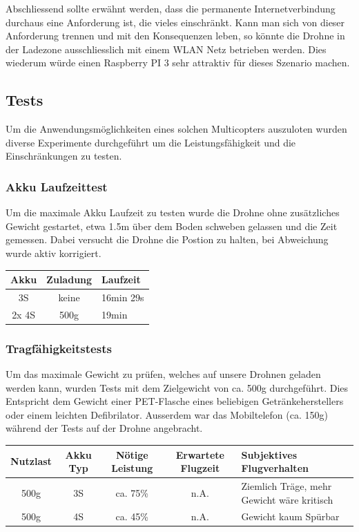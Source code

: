 Abschliessend sollte erwähnt werden, dass die permanente Internetverbindung durchaus eine Anforderung ist, die vieles einschränkt. Kann man sich von dieser Anforderung trennen und mit den Konsequenzen leben, so könnte die Drohne in der Ladezone ausschliesslich mit einem WLAN Netz betrieben werden. Dies wiederum würde einen Raspberry PI 3 sehr attraktiv für dieses Szenario machen.
 
\subsection{Tests}
Um die Anwendungsmöglichkeiten eines solchen Multicopters auszuloten wurden diverse Experimente durchgeführt um die Leistungsfähigkeit und die Einschränkungen zu testen. 

\subsubsection{Akku Laufzeittest}
Um die maximale Akku Laufzeit zu testen wurde die Drohne ohne zusätzliches Gewicht gestartet, etwa 1.5m über dem Boden schweben gelassen und die Zeit gemessen. Dabei versucht die Drohne die Postion zu halten, bei Abweichung wurde aktiv korrigiert. \\

\begin{tabularx}{\textwidth}{|c|c|X|}
\hline
\textbf{Akku} & \textbf{Zuladung} & \textbf{Laufzeit} \\ \hline \hline 
3S & keine & 16min 29s\\ \hline 
2x 4S & 500g & 19min\\ \hline 
\end{tabularx}
\newpage
\subsubsection{Tragfähigkeitstests}
Um das maximale Gewicht zu prüfen, welches auf unsere Drohnen geladen werden kann, wurden Tests mit dem Zielgewicht von ca. 500g durchgeführt. Dies Entspricht dem Gewicht einer PET-Flasche eines beliebigen Getränkeherstellers oder einem leichten Defibrilator. Ausserdem war das Mobiltelefon (ca. 150g) während der Tests auf der Drohne angebracht.  \\

\begin{tabularx}{\textwidth}{|c|c|c|c|X|}
\hline
\textbf{Nutzlast} & \textbf{Akku Typ} & \textbf{Nötige Leistung }& \textbf{Erwartete Flugzeit } & \textbf{Subjektives Flugverhalten }\\
\hline \hline
500g & 3S & ca. 75\%  & n.A. & Ziemlich Träge, mehr Gewicht wäre kritisch\\\hline
500g & 4S & ca. 45\%  & n.A. & Gewicht kaum Spürbar\\
\hline
\end{tabularx}\\

